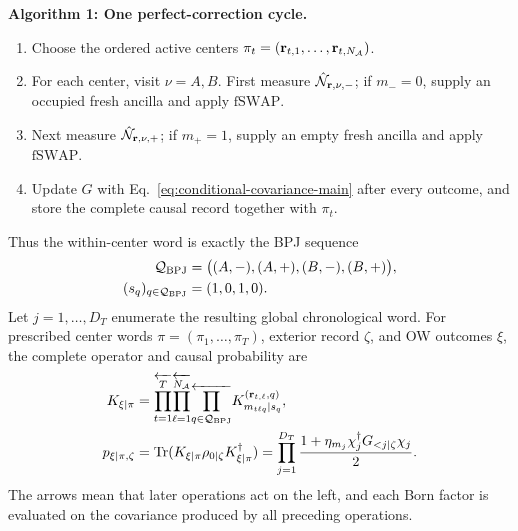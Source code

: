 \documentclass[aps,prx,twocolumn,superscriptaddress,longbibliography,nofootinbib,floatfix]{revtex4-2}
\newcommand{\mc}[1]{\mathcal{#1}}
\newcommand{\mr}[1]{\mathrm{#1}}
\newcommand{\h}[1]{\hat{#1}}
\newcommand{\hcN}{\h{\mc{N}}}
\newcommand{\bfr}{{\bf r}}
\newcommand{\fSWAP}{\mr{fSWAP}}
\begin{document}
\begin{mdframed}[nobreak=true,linewidth=0.5pt,innerleftmargin=5pt,
 innerrightmargin=5pt,innertopmargin=4pt,innerbottommargin=4pt]
\noindent\textbf{Algorithm 1: One perfect-correction cycle.}
\begin{enumerate}[leftmargin=1.35em,itemsep=1pt,topsep=3pt]
 \item Choose the ordered active centers
 \(\pi_t=(\bfr_{t,1},\ldots,\bfr_{t,N_{\mathcal A}})\).
 \item For each center, visit \(\nu=A,B\).  First measure
 \(\hcN_{\bfr,\nu,-}\); if \(m_-=0\), supply an occupied fresh ancilla and
 apply \(\fSWAP\).
 \item Next measure \(\hcN_{\bfr,\nu,+}\); if \(m_+=1\), supply an empty fresh
 ancilla and apply \(\fSWAP\).
 \item Update \(G\) with Eq.~\eqref{eq:conditional-covariance-main} after
 every outcome, and store the complete causal record together with \(\pi_t\).
\end{enumerate}
\end{mdframed}

Thus the within-center word is exactly the BPJ sequence
\begin{align}
 \mathcal Q_{\rm BPJ}
 &=\bigl((A,-),(A,+),(B,-),(B,+)\bigr),
 \nonumber\\
 (s_q)_{q\in\mathcal Q_{\rm BPJ}}&=(1,0,1,0).
 \label{eq:bpj-channel-word}
\end{align}
Let \(j=1,\ldots,D_T\) enumerate the resulting global chronological word.
For prescribed center words
\(\pi=(\pi_1,\ldots,\pi_T)\), exterior record \(\zeta\), and OW outcomes
\(\xi\), the complete operator and causal probability are
\begin{align}
 K_{\xi|\pi}
 &=\overleftarrow{\prod_{t=1}^{T}}
   \overleftarrow{\prod_{\ell=1}^{N_{\mathcal A}}}
   \overleftarrow{\prod_{q\in\mathcal Q_{\rm BPJ}}}
   K^{(\bfr_{t,\ell},q)}_{m_{t\ell q}|s_q},
 \nonumber\\
 p_{\xi|\pi,\zeta}
 &=\Tr(K_{\xi|\pi}\rho_{0|\zeta}K_{\xi|\pi}^\dagger)
 =\prod_{j=1}^{D_T}
 \frac{1+\eta_{m_j}\chi_j^\dagger G_{<j|\zeta}\chi_j}{2}.
 \label{eq:causal-cycle-word}
\end{align}
The arrows mean that later operations act on the left, and each Born factor is
evaluated on the covariance produced by all preceding operations.
\end{document}
